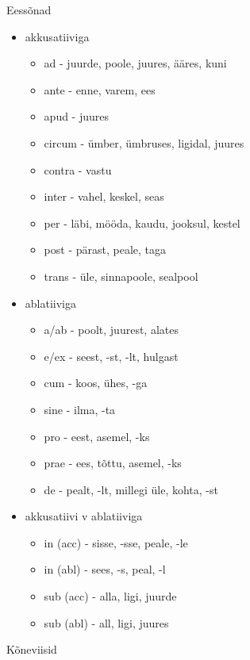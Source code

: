\documentclass[12pt]{article}
\newenvironment{tiitel}
	{\begin{center}
	\bfseries
	\large
	}{
	\end{center}
	}
\begin{document}
\pagebreak
\begin{tiitel}
Eessõnad
\end{tiitel}
\begin{itemize}
 \item akkusatiiviga
 \begin{itemize}
  \item ad - juurde, poole, juures, ääres, kuni
  \item ante - enne, varem, ees
  \item apud - juures
  \item circum - ümber, ümbruses, ligidal, juures
  \item contra - vastu
  \item inter - vahel, keskel, seas
  \item per - läbi, mööda, kaudu, jooksul, kestel
  \item post - pärast, peale, taga
  \item trans - üle, sinnapoole, sealpool
 \end{itemize}
 \item ablatiiviga
 \begin{itemize}
  \item a/ab - poolt, juurest, alates
  \item e/ex - seest, -st, -lt, hulgast
  \item cum - koos, ühes, -ga
  \item sine - ilma, -ta
  \item pro - eest, asemel, -ks
  \item prae - ees, tõttu, asemel, -ks
  \item de - pealt, -lt, millegi üle, kohta, -st
 \end{itemize}
 \item akkusatiivi v ablatiiviga
 \begin{itemize}
  \item in (acc) - sisse, -sse, peale, -le
  \item in (abl) - sees, -s, peal, -l
  \item sub (acc) - alla, ligi, juurde
  \item sub (abl) - all, ligi, juures
 \end{itemize}
\end{itemize}
\pagebreak
\begin{tiitel}
Kõneviisid
\end{tiitel}
\end{document}
